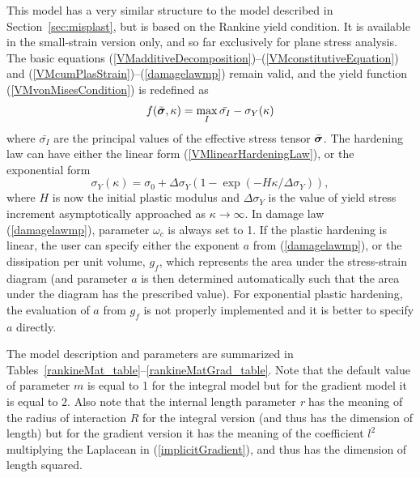 \documentclass[a4paper]{article}
\newcommand{\mbf}[1]{\mbox{\boldmath$#1$}}
\newcommand{\param}[1]{{\it #1}}
\newcommand{\vsig}{\mbf{\sigma}}%
\begin{document}
This model has a very similar structure to the model described in Section~\ref{sec:misplast},
but is based on the Rankine yield condition. It is available in the small-strain version
only, and so far exclusively for plane stress analysis. 
The basic equations (\ref{VMadditiveDecomposition})--(\ref{VMconstitutiveEquation}) 
and (\ref{VMcumPlasStrain})--(\ref{damagelawmp}) remain valid, 
and the yield function (\ref{VMvonMisesCondition}) is redefined as
\begin{equation}\label{RankineCondition}
f(\bar{\vsig},\kappa) = \max_{I}\bar{\sigma_I}-\sigma_Y(\kappa)
\end{equation}
where $\bar{\sigma_I}$ are the principal values of the effective stress tensor $\bar{\vsig}$.
The hardening law can have either the linear form (\ref{VMlinearHardeningLaw}), or the exponential form
\begin{equation}\label{VMexpHardeningLaw}
\sigma_Y(\kappa) = \sigma_0 + \Delta\sigma_Y\left(1-\exp(-H\kappa/\Delta\sigma_Y)\right),
\end{equation}
where $H$ is now the initial plastic modulus and $\Delta\sigma_Y$ is the value of yield stress
increment asymptotically approached as $\kappa\rightarrow\infty$.
In damage law (\ref{damagelawmp}), parameter $\omega_c$ is always set to 1.
If the plastic hardening is linear, the user can specify either the exponent $a$ from (\ref{damagelawmp}),
or the dissipation per unit volume, $g_f$, which represents the area under the
stress-strain diagram (and parameter $a$ is then determined automatically such that
the area under the diagram has the prescribed value).
For exponential plastic hardening, the evaluation of $a$ from $g_f$ is not properly
implemented and it is better to specify $a$ directly.

The model description and parameters are summarized in Tables~\ref{rankineMat_table}--\ref{rankineMatGrad_table}. Note that the default value of parameter $m$ is equal to 1 for the
integral model but for the gradient model it is equal to 2. 
Also note that the internal length parameter \param{r} has the meaning of the
radius of interaction $R$ for the integral version (and thus has the dimension
of length) but for the gradient version it has the meaning of the coefficient $l^2$
multiplying the Laplacean in (\ref{implicitGradient}), and thus has the dimension of length squared.
\end{document}
